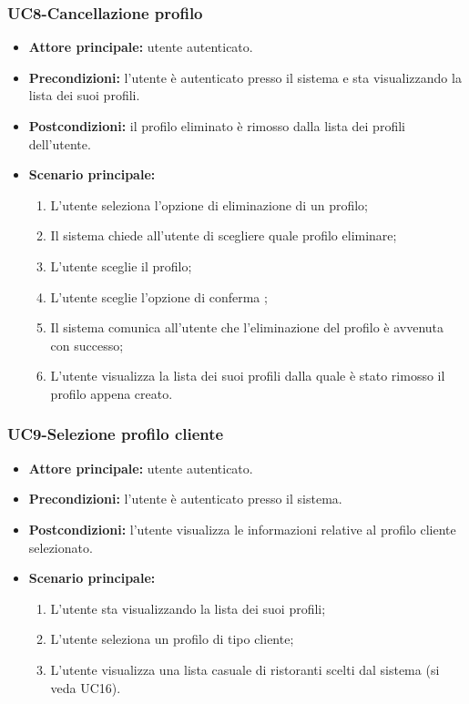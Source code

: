 \subsubsection{UC8-Cancellazione profilo}
\begin{itemize}
\item \textbf{Attore principale:} utente autenticato.
\item \textbf{Precondizioni:} l'utente è autenticato presso il sistema e sta visualizzando la lista dei suoi profili.
\item \textbf{Postcondizioni:} il profilo eliminato è rimosso dalla lista dei profili dell'utente.
\item \textbf{Scenario principale:}
\begin{enumerate}
    \item L'utente seleziona l'opzione di eliminazione di un profilo;
    \item Il sistema chiede all'utente di scegliere quale profilo eliminare;
    \item L'utente sceglie il profilo;
    \item L'utente sceglie l'opzione di conferma ;
    \item Il sistema comunica all'utente che l'eliminazione del profilo è avvenuta con successo;
    \item L'utente visualizza la lista dei suoi profili dalla quale è stato rimosso il profilo appena creato.
\end{enumerate}
\end{itemize}

\subsubsection{UC9-Selezione profilo cliente}
\begin{itemize}
\item \textbf{Attore principale:} utente autenticato.
\item \textbf{Precondizioni:} l'utente è autenticato presso il sistema.
\item \textbf{Postcondizioni:} l'utente visualizza le informazioni relative al profilo cliente selezionato.
\item \textbf{Scenario principale:}
\begin{enumerate}
    \item L'utente sta visualizzando la lista dei suoi profili;
    \item L'utente seleziona un profilo di tipo cliente;
    \item L'utente visualizza una lista casuale di ristoranti scelti dal sistema (si veda UC16).
\end{enumerate}
\end{itemize}

